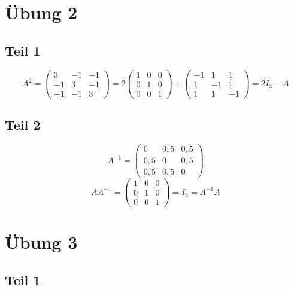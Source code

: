 \documentclass[a4paper,10pt]{article}
\begin{document}
\section*{Übung 2}

\subsection*{Teil 1}

\begin{equation}
 A^2 = 
   \begin{pmatrix}
    3 & -1 & -1\\
    -1 & 3 & -1\\
    -1 & -1 & 3
   \end{pmatrix} = 
   2\begin{pmatrix}
    1 & 0 & 0\\
    0 & 1 & 0\\
    0 & 0 & 1
   \end{pmatrix} +
   \begin{pmatrix}
    -1 & 1 & 1\\
    1 & -1 & 1\\
    1 & 1 & -1
   \end{pmatrix} = 2I_3 - A
\end{equation}

\subsection*{Teil 2}

\begin{equation}
 A^{-1} =
   \begin{pmatrix}
    0 & 0,5 & 0,5\\
    0,5 & 0 & 0,5\\
    0,5 & 0,5 & 0
   \end{pmatrix}
\end{equation}
\begin{equation}
 AA^{-1} =
   \begin{pmatrix}
    1 & 0 & 0\\
    0 & 1 & 0\\
    0 & 0 & 1
   \end{pmatrix} = I_3 = A^{-1}A
\end{equation}

\section*{Übung 3}

\subsection*{Teil 1}
\end{document}
